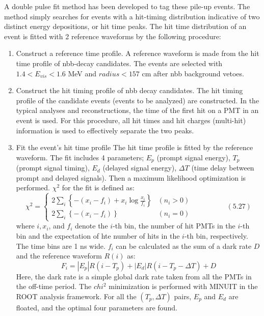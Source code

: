 A double pulse fit method has been developed to tag these pile-up events. The method simply searches for events with a hit-timing distribution indicative of two distinct energy depositions, or hit time peaks. The hit time distribution of an event is fitted with 2 reference waveforms by the following procedure:
\begin{enumerate}
	\item Construct a reference time profile.
	A reference waveform is made from the hit time profile of \2nbb-decay candidates. The events are selected with $1.4 < E_{vis}<1.6$ MeV and $radius < 157$ cm after \0nbb background vetoes. 
	\item Construct the hit timing profile of \0nbb decay candidates.
	The hit timing profile of the candidate events (events to be analyzed) are constructed. In the typical analyses and reconstructions, the time of the first hit on a PMT in an event is used. For this procedure, all hit times and hit charges (multi-hit) information is used to effectively separate the two peaks. 
	\item Fit the event's hit time profile
	The hit time profile is fitted by the reference waveform. The fit includes 4 parameters; $E_p$ (prompt signal energy), $T_p$ (prompt signal timing), $E_d$ (delayed signal energy), $\Delta T$ (time delay between prompt and delayed signals). Then a maximum likelihood optimization is performed. $\chi^2$ for the fit is defined as:
	\begin{equation}
		\chi^2 = 
		\begin{cases}
		2\sum_i \left\{ -(x_i-f_i) + x_i \log \frac{x_i}{f_i} \right\} & (n_i > 0) \\
		2\sum_i \left\{ -(x_i-f_i) \right\} & (n_i = 0)
		\end{cases}
		\hspace{2cm} (5.27)
	\end{equation}
	where $i, x_i$, and $f_i$ denote the $i$-th bin, the number of hit PMTs in the $i$-th bin and the expectation of hte number of hits in the $i$-th bin, respectively. The time bins are 1 ns wide. $f_i$ can be calculated as the sum of a dark rate $D$ and the reference waveform $R(i)$ as:
	\begin{equation}
		F_i = |E_p|R(i-T_p)+|E_d|R(i-T_p-\Delta T) + D
	\end{equation}
	Here, the dark rate is a simple global dark rate taken from all the PMTs in the off-time period. The $chi^2$ minimization is performed with MINUIT in the ROOT analysis framework. For all the $(T_p, \Delta T)$ pairs, $E_p$ and $E_d$ are floated, and the optimal four parameters are found.

\end{enumerate}
